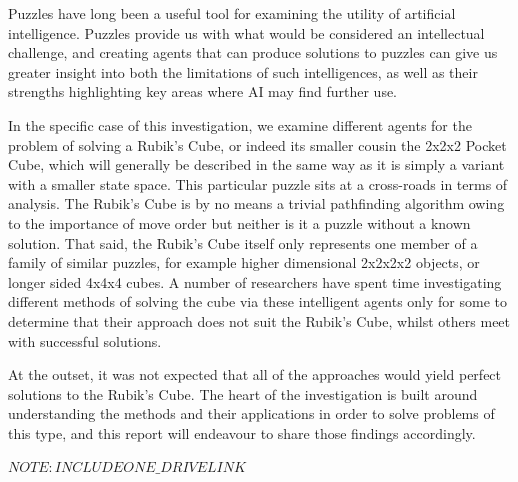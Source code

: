 \documentclass[UKenglish]{svproc}
\begin{document}
\hspace{8pt}

Puzzles have long been a useful tool for examining the utility of artificial intelligence. Puzzles provide us with what would be considered an intellectual challenge, and creating agents that can produce solutions to puzzles can give us greater insight into both the limitations of such intelligences, as well as their strengths highlighting key areas where AI may find further use.

In the specific case of this investigation, we examine different agents for the problem of solving a Rubik's Cube, or indeed its smaller cousin the 2x2x2 Pocket Cube, which will generally be described in the same way as it is simply a variant with a smaller state space. This particular puzzle sits at a cross-roads in terms of analysis. The Rubik's Cube is by no means a trivial pathfinding algorithm owing to the importance of move order but neither is it a puzzle without a known solution. That said, the Rubik's Cube itself only represents one member of a family of similar puzzles, for example higher dimensional 2x2x2x2 objects, or longer sided 4x4x4 cubes. A number of researchers have spent time investigating different methods of solving the cube via these intelligent agents only for some to determine that their approach does not suit the Rubik's Cube, whilst others meet with successful solutions.

At the outset, it was not expected that all of the approaches would yield perfect solutions to the Rubik's Cube. The heart of the investigation is built around understanding the methods and their applications in order to solve problems of this type, and this report will endeavour to share those findings accordingly. 

$NOTE: INCLUDE ONE\_DRIVE LINK$

\end{document}
